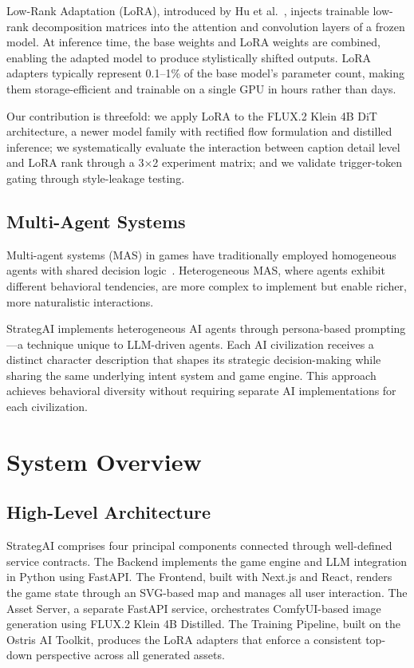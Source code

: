 \documentclass[conference]{IEEEtran}
\begin{document}
Low-Rank Adaptation (LoRA), introduced by Hu et
al.~\cite{hu2022lora}, injects trainable low-rank decomposition matrices
into the attention and convolution layers of a frozen model. At inference
time, the base weights and LoRA weights are combined, enabling the adapted
model to produce stylistically shifted outputs. LoRA adapters typically
represent 0.1--1\% of the base model's parameter count, making them
storage-efficient and trainable on a single GPU in hours rather than days.

Our contribution is threefold: we apply LoRA to the FLUX.2 Klein 4B DiT
architecture, a newer model family with rectified flow formulation and
distilled inference; we systematically evaluate the interaction between
caption detail level and LoRA rank through a 3$\times$2 experiment matrix;
and we validate trigger-token gating through style-leakage testing.

\subsection{Multi-Agent Systems}

Multi-agent systems (MAS) in games have traditionally employed homogeneous
agents with shared decision logic~\cite{wooldridge2009multiagent}.
Heterogeneous MAS, where agents exhibit different behavioral tendencies,
are more complex to implement but enable richer, more naturalistic
interactions.

StrategAI implements heterogeneous AI agents through persona-based
prompting---a technique unique to LLM-driven agents. Each AI civilization
receives a distinct character description that shapes its strategic
decision-making while sharing the same underlying intent system and game
engine. This approach achieves behavioral diversity without requiring
separate AI implementations for each civilization.

\FloatBarrier
\section{System Overview}
\label{sec:architecture}

\subsection{High-Level Architecture}

StrategAI comprises four principal components connected through
well-defined service contracts. The Backend implements the game engine and
LLM integration in Python using FastAPI. The Frontend, built with Next.js
and React, renders the game state through an SVG-based map and manages all
user interaction. The Asset Server, a separate FastAPI service, orchestrates
ComfyUI-based image generation using FLUX.2 Klein 4B Distilled. The
Training Pipeline, built on the Ostris AI Toolkit, produces the LoRA
adapters that enforce a consistent top-down perspective across all generated assets.
\end{document}
